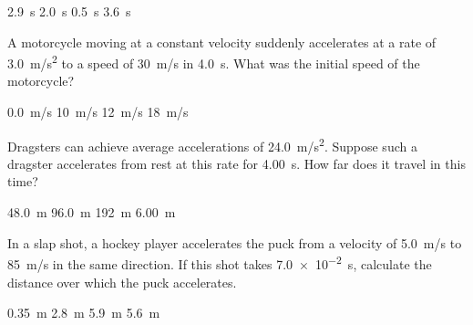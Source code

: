 \documentclass{exam}
\begin{document}
\begin{questions}
\begin{choices}
\choice \SI{2.9}{s}
\correctchoice \SI{2.0}{s}
\choice \SI{0.5}{s}
\choice \SI{3.6}{s}
\end{choices}



\question %

A motorcycle moving at a constant velocity suddenly accelerates at a rate of \SI{3.0}{m/s^2} to a speed of \SI{30}{m/s} in \SI{4.0}{s}. What was the initial speed of the motorcycle?

\begin{choices}
\choice \SI{0.0}{m/s}
\choice \SI{10}{m/s}
\choice \SI{12}{m/s}
\CorrectChoice \SI{18}{m/s}
\end{choices}

\question %
Dragsters can achieve average accelerations of \SI{24.0}{m/s^2}. Suppose such a dragster accelerates from rest at this rate for \SI{4.00}{s}. How far does it travel in this time?

\begin{choices}
\choice \SI{48.0}{m}
\choice \SI{96.0}{m}
\correctchoice \SI{192}{m}
\choice \SI{6.00}{m}
\end{choices}






\question %
In a slap shot, a hockey player accelerates the puck from a velocity of \SI{5.0}{m/s} to \SI{85}{m/s} in the same direction. If this shot takes \SI{7.0e-2}{s}, calculate the distance over which the puck accelerates.

\begin{choices}
\choice \SI{0.35}{m}
\correctchoice \SI{2.8}{m}
\choice \SI{5.9}{m}
\choice \SI{5.6}{m}
\end{choices}


\end{questions}
\end{document}
